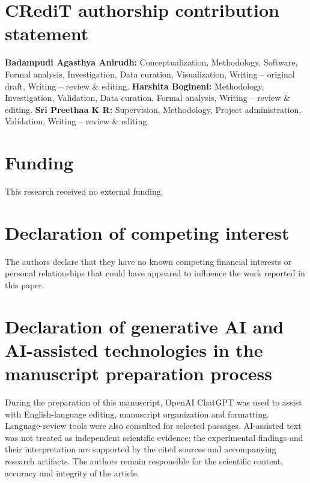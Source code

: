 \documentclass[a4paper,fleqn]{cas-sc}
\begin{document}
\section*{CRediT authorship contribution statement}
\textbf{Badampudi Agasthya Anirudh:} Conceptualization, Methodology, Software, Formal analysis, Investigation, Data curation, Visualization, Writing -- original draft, Writing -- review \& editing. \textbf{Harshita Bogineni:} Methodology, Investigation, Validation, Data curation, Formal analysis, Writing -- review \& editing. \textbf{Sri Preethaa K R:} Supervision, Methodology, Project administration, Validation, Writing -- review \& editing.

\section*{Funding}
This research received no external funding.

\section*{Declaration of competing interest}
The authors declare that they have no known competing financial interests or personal relationships that could have appeared to influence the work reported in this paper.

\section*{Declaration of generative AI and AI-assisted technologies in the manuscript preparation process}
During the preparation of this manuscript, OpenAI ChatGPT was used to assist with English-language editing, manuscript organization and formatting. Language-review tools were also consulted for selected passages. AI-assisted text was not treated as independent scientific evidence; the experimental findings and their interpretation are supported by the cited sources and accompanying research artifacts. The authors remain responsible for the scientific content, accuracy and integrity of the article.


\clearpage


\end{document}
